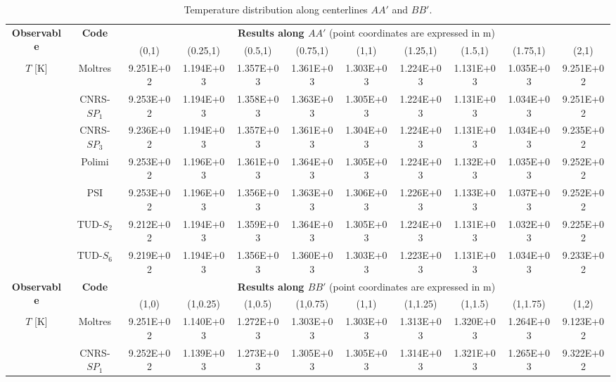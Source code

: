 \begin{table*}[tb]
	\caption{Temperature distribution along centerlines $AA'$ and $BB'$.}
	\centering
	\footnotesize
	\setlength\tabcolsep{1.5pt}
	\begin{tabular}{c c c c c c c c c c c}
		\toprule
		\multirow{2}{*}{\textbf{Observable}} & \multirow{2}{*}{\textbf{Code}} & \multicolumn{9}{c}{\textbf{Results along $AA'$} (point coordinates are expressed in m)} \\
		& & {(0,1)} & {(0.25,1)} & {(0.5,1)} & {(0.75,1)} & {(1,1)} & {(1.25,1)} & {(1.5,1)} & {(1.75,1)} & {(2,1)} \\
		\midrule
		\multirow{7}{*}{$T$ [K]} & Moltres & 9.251E+02 & 1.194E+03 & 1.357E+03 & 1.361E+03 &
		1.303E+03 & 1.224E+03 & 1.131E+03 & 1.035E+03 & 9.251E+02 \\
		& CNRS-$SP_1$ & 9.253E+02 & 1.194E+03 & 1.358E+03 & 1.363E+03 & 1.305E+03 & 1.224E+03 & 1.131E+03 & 1.034E+03 & 9.251E+02 \\
		& CNRS-$SP_3$ & 9.236E+02 & 1.194E+03 & 1.357E+03 & 1.361E+03 & 1.304E+03 & 1.224E+03 & 1.131E+03 & 1.034E+03 & 9.235E+02 \\
		& Polimi & 9.253E+02 & 1.196E+03 & 1.361E+03 & 1.364E+03 & 1.305E+03 & 1.224E+03 & 1.132E+03 & 1.035E+03 & 9.252E+02 \\
		& PSI & 9.253E+02 & 1.196E+03 & 1.356E+03 & 1.363E+03 & 1.306E+03 & 1.226E+03 & 1.133E+03 & 1.037E+03 & 9.252E+02 \\
		& TUD-$S_2$ & 9.212E+02 & 1.194E+03 & 1.359E+03 & 1.364E+03 & 1.305E+03 & 1.224E+03 & 1.131E+03 & 1.032E+03 & 9.225E+02 \\
		& TUD-$S_6$ & 9.219E+02 & 1.194E+03 & 1.356E+03 & 1.360E+03 & 1.303E+03 & 1.223E+03 & 1.131E+03 & 1.034E+03 & 9.233E+02 \\
		\midrule
		\midrule
		\multirow{2}{*}{\textbf{Observable}} & \multirow{2}{*}{\textbf{Code}} & \multicolumn{9}{c}{\textbf{Results along $BB'$} (point coordinates are expressed in m)} \\
		& & {(1,0)} & {(1,0.25)} & {(1,0.5)} & {(1,0.75)} & {(1,1)} & {(1,1.25)} & {(1,1.5)} & {(1,1.75)} & {(1,2)} \\
		\midrule
		\multirow{7}{*}{$T$ [K]} & Moltres & 9.251E+02 & 1.140E+03 & 1.272E+03 & 1.303E+03 &
		1.303E+03 & 1.313E+03 & 1.320E+03 & 1.264E+03 & 9.123E+02 \\
		& CNRS-$SP_1$ & 9.252E+02 & 1.139E+03 & 1.273E+03 & 1.305E+03 & 1.305E+03 & 1.314E+03 & 1.321E+03 & 1.265E+03 & 9.322E+02 \\

\end{tabular}
\end{table*}
